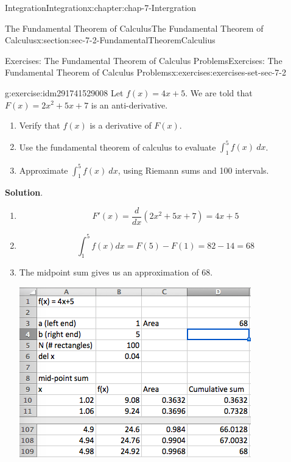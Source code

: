 \documentclass[oneside,10pt,]{book}
\numberwithin{equation}{section}
\begin{document}
\begin{chapterptx}{Integration}{}{Integration}{}{}{x:chapter:chap-7-Intergration}
\begin{sectionptx}{The Fundamental Theorem of Calculus}{}{The Fundamental Theorem of Calculus}{}{}{x:section:sec-7-2-FundamentalTheoremCalculius}
%
%
\typeout{************************************************}
\typeout{************************************************}
%
\begin{exercises-subsection}{Exercises: The Fundamental Theorem of Calculus Problems}{}{Exercises: The Fundamental Theorem of Calculus Problems}{}{}{x:exercises:exercises-set-sec-7-2}
\begin{divisionexercise}{1}{}{}{g:exercise:idm291741529008}%
Let \(f(x) = 4 x + 5\).  We are told that \(F(x) = 2 x^2 + 5 x + 7\) is an anti-derivative.%
%
\begin{enumerate}[label=(\alph*)]
\item{}Verify that \(f(x)\) is a derivative of \(F(x)\).%
\item{}Use the fundamental theorem of calculus to evaluate \(\int_1^5 f(x)\ dx\).%
\item{}Approximate \(\int_1^5 f(x)\ dx\), using Riemann sums and 100 intervals.%
\end{enumerate}
\par\smallskip%
\noindent\textbf{Solution}.\hypertarget{g:solution:idm291741523264}{}\quad{}%
\begin{enumerate}[label=(\alph*)]
\item{}%
\begin{equation*}
F' (x)=\frac{d}{dx}  (2 x^2+ 5 x + 7)=4x+5     
\end{equation*}
%
\item{}%
\begin{equation*}
\int_1^5 f(x) dx=F(5)-F(1)= 82-14=68
\end{equation*}
%
\item{}The midpoint sum gives us an approximation of 68.%
\begin{sidebyside}{1}{0.25}{0.25}{0}%
\begin{sbspanel}{0.5}%
\includegraphics[width=\linewidth]{images/sec7-2-sol1a.png}

\end{sbspanel}
\end{sidebyside}
\end{enumerate}
\end{divisionexercise}
\end{exercises-subsection}
\end{sectionptx}
\end{chapterptx}
\end{document}
